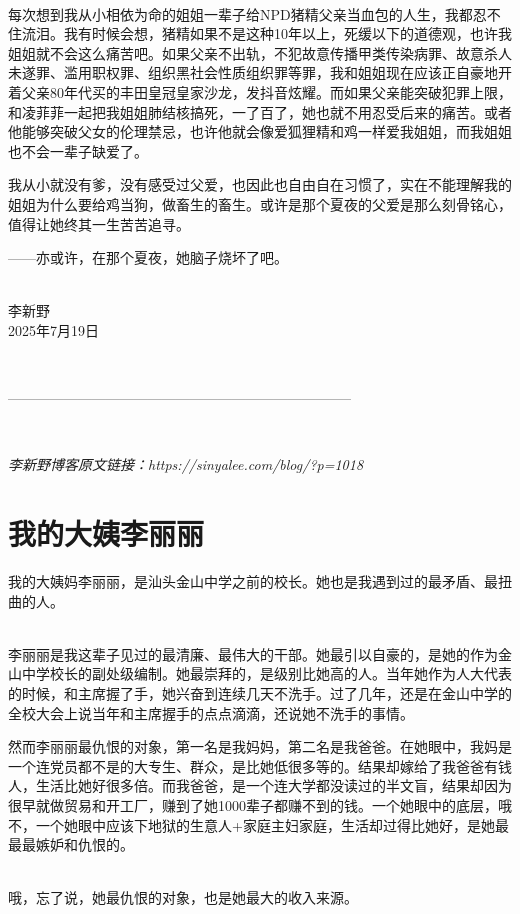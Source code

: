 \ 

每次想到我从小相依为命的姐姐一辈子给NPD猪精父亲当血包的人生，我都忍不住流泪。我有时候会想，猪精如果不是这种10年以上，死缓以下的道德观，也许我姐姐就不会这么痛苦吧。如果父亲不出轨，不犯故意传播甲类传染病罪、故意杀人未遂罪、滥用职权罪、组织黑社会性质组织罪等罪，我和姐姐现在应该正自豪地开着父亲80年代买的丰田皇冠皇家沙龙，发抖音炫耀。而如果父亲能突破犯罪上限，和凌菲菲一起把我姐姐肺结核搞死，一了百了，她也就不用忍受后来的痛苦。或者他能够突破父女的伦理禁忌，也许他就会像爱狐狸精和鸡一样爱我姐姐，而我姐姐也不会一辈子缺爱了。

我从小就没有爹，没有感受过父爱，也因此也自由自在习惯了，实在不能理解我的姐姐为什么要给鸡当狗，做畜生的畜生。或许是那个夏夜的父爱是那么刻骨铭心，值得让她终其一生苦苦追寻。

——亦或许，在那个夏夜，她脑子烧坏了吧。

\ \\
李新野\\
2025年7月19日

\ 

--------------------------------------------------------------------------

\

\textit{李新野博客原文链接：https://sinyalee.com/blog/?p=1018}

\newpage

\section{我的大姨李丽丽}
\label{aunt}
我的大姨妈李丽丽，是汕头金山中学之前的校长。她也是我遇到过的最矛盾、最扭曲的人。

\ \\
李丽丽是我这辈子见过的最清廉、最伟大的干部。她最引以自豪的，是她的作为金山中学校长的副处级编制。她最崇拜的，是级别比她高的人。当年她作为人大代表的时候，和主席握了手，她兴奋到连续几天不洗手。过了几年，还是在金山中学的全校大会上说当年和主席握手的点点滴滴，还说她不洗手的事情。

然而李丽丽最仇恨的对象，第一名是我妈妈，第二名是我爸爸。在她眼中，我妈是一个连党员都不是的大专生、群众，是比她低很多等的。结果却嫁给了我爸爸有钱人，生活比她好很多倍。而我爸爸，是一个连大学都没读过的半文盲，结果却因为很早就做贸易和开工厂，赚到了她1000辈子都赚不到的钱。一个她眼中的底层，哦不，一个她眼中应该下地狱的生意人+家庭主妇家庭，生活却过得比她好，是她最最最嫉妒和仇恨的。

\ \\
哦，忘了说，她最仇恨的对象，也是她最大的收入来源。

